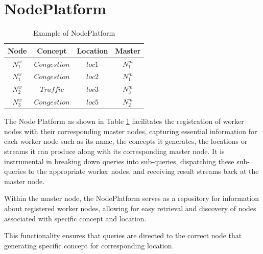 \documentclass[5p,times]{elsarticle}
\begin{document}
\section*{NodePlatform}



\begin{table}[t]

  \captionsetup{justification=raggedright, singlelinecheck=false} %
  \caption{\newline Example of NodePlatform}
  \vspace{-1em} %


  \begin{tabular}{cccc}
  \hline
  \textbf{Node} & \textbf{Concept} & \textbf{Location} & \textbf{Master} \\
  \hline
  $N^w_1$ & $Congestion$ & $loc1$ & $N^m_1$ \\
  $N^w_1$ & $Congestion$ & $loc2$ & $N^m_1$ \\
  $N^w_2$ & $Traffic$    & $loc3$ & $N^m_3$ \\
  $N^w_3$ & $Congestion$ & $loc5$ & $N^m_2$ \\
  \hline
  \end{tabular}
  \label{tab:NodePlatformTbl}
  \end{table}




The Node Platform as shown in Table \ref{tab:NodePlatformTbl} facilitates the registration of worker nodes
 with their corresponding master nodes, capturing essential information for each worker node
  such as its name,  the concepts it generates, the locations or streams it can produce 
  along with its corresponding master node.
   It is instrumental in breaking down queries into sub-queries, dispatching these sub-queries to 
   the appropriate worker nodes, and receiving result streams back at the master node.

Within the master node, the NodePlatform serves as a repository for information about registered 
worker nodes, allowing for easy retrieval and discovery of nodes associated with specific concept and location.

This functionality ensures that queries are directed to the correct node that generating specific concept for 
corresponding location.
\end{document}

